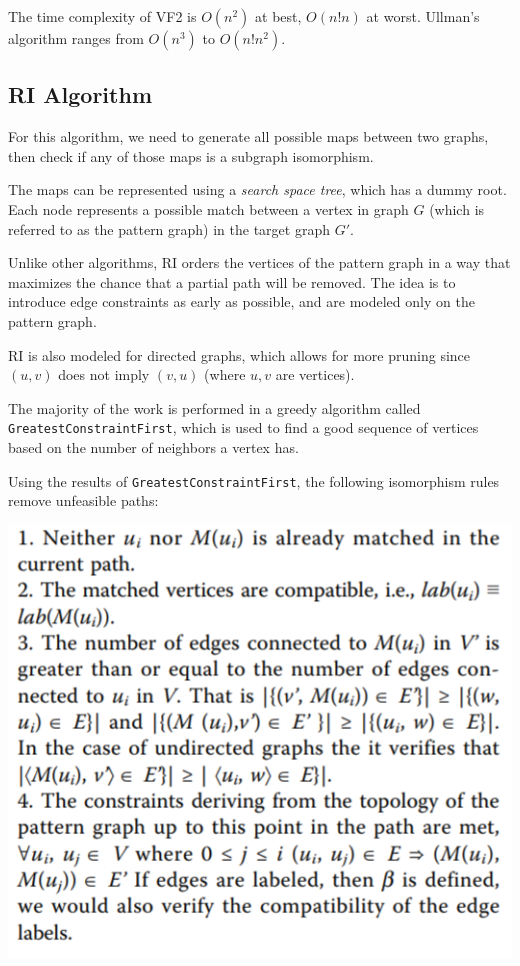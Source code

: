 \documentclass{article}
\begin{document}
  The time complexity of VF2 is $O(n^2)$ at best, $O(n!n)$ at worst.
  Ullman's algorithm ranges from $O(n^3)$ to $O(n!n^2)$.
  \cite{cordella}

  \subsection{RI Algorithm}

  For this algorithm, we need to generate all possible maps between two graphs, then check if any of those maps is a subgraph isomorphism.

  The maps can be represented using a \textit{search space tree}, which has a dummy root. Each node represents a possible match between a vertex in graph $G$ (which is referred to as the pattern graph) in the target graph $G'$.

  Unlike other algorithms, RI orders the vertices of the pattern graph in a way that maximizes the chance that a partial path will be removed. The idea is to introduce edge constraints as early as possible, and are modeled only on the pattern graph.

  RI is also modeled for directed graphs, which allows for more pruning since $(u,v)$ does not imply $(v, u)$ (where $u, v$ are vertices).

  The majority of the work is performed in a greedy algorithm called \texttt{GreatestConstraintFirst}, which is used to find a good sequence of vertices based on the number of neighbors a vertex has.

  Using the results of \texttt{GreatestConstraintFirst}, the following isomorphism rules remove unfeasible paths:

  \includegraphics{images/ri_rules.png}
\end{document}
